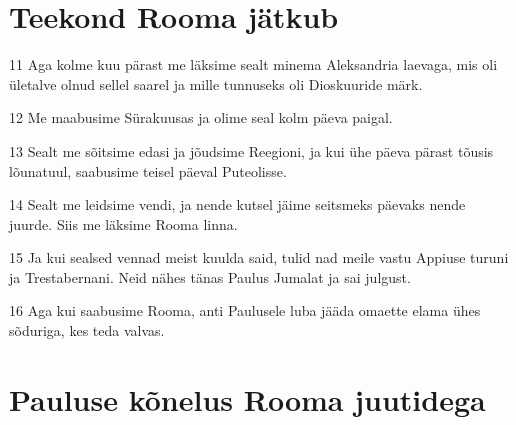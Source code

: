 \section*{Teekond Rooma jätkub}

\par 11 Aga kolme kuu pärast me läksime sealt minema Aleksandria laevaga, mis oli ületalve olnud sellel saarel ja mille tunnuseks oli Dioskuuride märk.
\par 12 Me maabusime Sürakuusas ja olime seal kolm päeva paigal.
\par 13 Sealt me sõitsime edasi ja jõudsime Reegioni, ja kui ühe päeva pärast tõusis lõunatuul, saabusime teisel päeval Puteolisse.
\par 14 Sealt me leidsime vendi, ja nende kutsel jäime seitsmeks päevaks nende juurde. Siis me läksime Rooma linna.
\par 15 Ja kui sealsed vennad meist kuulda said, tulid nad meile vastu Appiuse turuni ja Trestabernani. Neid nähes tänas Paulus Jumalat ja sai julgust.
\par 16 Aga kui saabusime Rooma, anti Paulusele luba jääda omaette elama ühes sõduriga, kes teda valvas.

\section*{Pauluse kõnelus Rooma juutidega}

